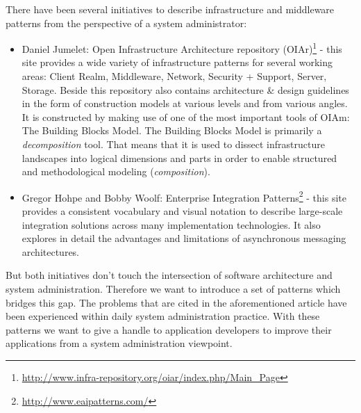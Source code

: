 There have been several initiatives to describe infrastructure and middleware patterns from the perspective of a system administrator: 
\begin{itemize}
	\item Daniel Jumelet: Open Infrastructure Architecture repository (OIAr)\footnote{\url{http://www.infra-repository.org/oiar/index.php/Main_Page}} - this site provides a wide variety of infrastructure patterns for several working areas: Client Realm, Middleware, Network, Security + Support, Server, Storage. Beside this repository also contains architecture \& design guidelines in the form of construction models at various levels and from various angles. It is constructed by making use of one of the most important tools of OIAm: The Building Blocks Model. The Building Blocks Model is primarily a \textit{decomposition} tool. That means that it is used to dissect infrastructure landscapes into logical dimensions and parts in order to enable structured and methodological modeling (\textit{composition}). 
	\item Gregor Hohpe and Bobby Woolf: Enterprise Integration Patterns\footnote{\url{http://www.eaipatterns.com/}} - this site provides a consistent vocabulary and visual notation to describe large-scale integration solutions across many implementation technologies. It also explores in detail the advantages and limitations of asynchronous messaging architectures. 
\end{itemize}

But both initiatives don't touch the intersection of software architecture and system administration. Therefore we want to introduce a set of patterns which bridges this gap. The problems that are cited in the aforementioned article have been experienced within daily system administration practice. With these patterns we want to give a handle to application developers to improve their applications from a system administration viewpoint.
